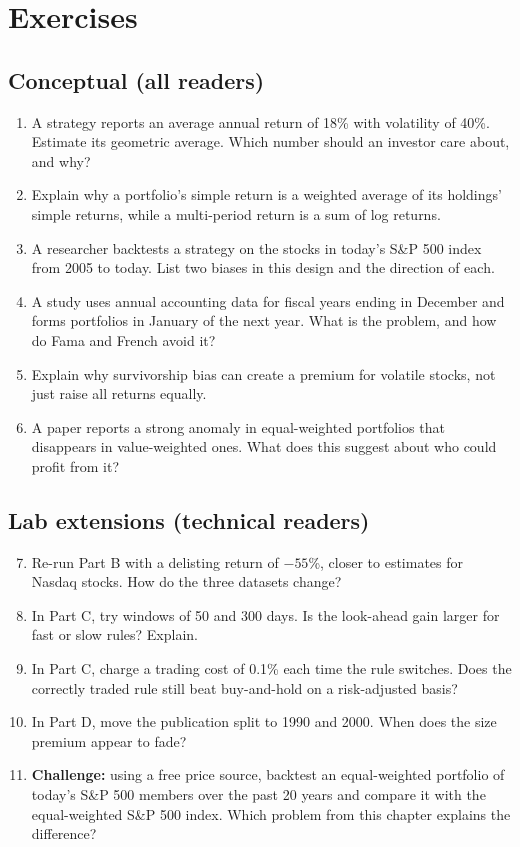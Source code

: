 \section*{Exercises}

\subsection*{Conceptual (all readers)}

\begin{enumerate}
  \item A strategy reports an average annual return of 18\% with volatility of 40\%. Estimate its geometric average. Which number should an investor care about, and why?
  \item Explain why a portfolio's simple return is a weighted average of its holdings' simple returns, while a multi-period return is a sum of log returns.
  \item A researcher backtests a strategy on the stocks in today's S\&P 500 index from 2005 to today. List two biases in this design and the direction of each.
  \item A study uses annual accounting data for fiscal years ending in December and forms portfolios in January of the next year. What is the problem, and how do Fama and French avoid it?
  \item Explain why survivorship bias can create a premium for volatile stocks, not just raise all returns equally.
  \item A paper reports a strong anomaly in equal-weighted portfolios that disappears in value-weighted ones. What does this suggest about who could profit from it?
\end{enumerate}

\subsection*{Lab extensions (technical readers)}

\begin{enumerate}
  \setcounter{enumi}{6}
  \item Re-run Part B with a delisting return of $-55$\%, closer to estimates for Nasdaq stocks. How do the three datasets change?
  \item In Part C, try windows of 50 and 300 days. Is the look-ahead gain larger for fast or slow rules? Explain.
  \item In Part C, charge a trading cost of 0.1\% each time the rule switches. Does the correctly traded rule still beat buy-and-hold on a risk-adjusted basis?
  \item In Part D, move the publication split to 1990 and 2000. When does the size premium appear to fade?
  \item \textbf{Challenge:} using a free price source, backtest an equal-weighted portfolio of today's S\&P 500 members over the past 20 years and compare it with the equal-weighted S\&P 500 index. Which problem from this chapter explains the difference?
\end{enumerate}


